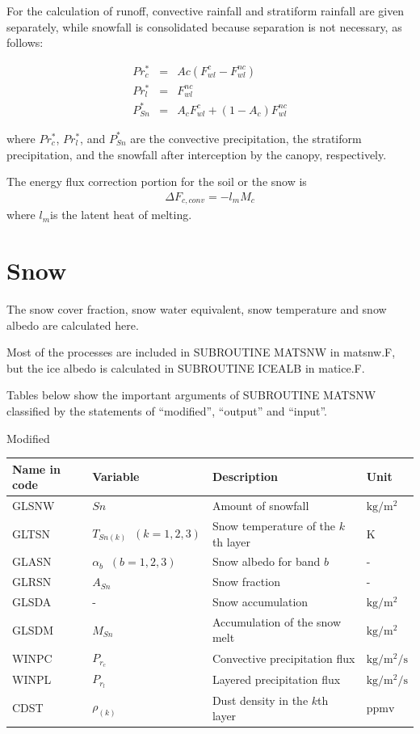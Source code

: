 For the calculation of runoff, convective rainfall and stratiform rainfall are given separately, while snowfall is consolidated because separation is not necessary, as follows:

\begin{eqnarray}
 Pr_c^\ast &=& Ac ( F_{wl}^{c} - F_{wl}^{nc} ) \\
 Pr_l^\ast &=& F_{wl}^{nc} \\
 P_{Sn}^\ast &=& A_c F_{wl}^{c} + (1-A_c) F_{wl}^{nc}
\end{eqnarray}

where \(Pr_c^*\), \(Pr_l^*\), and \(P_{Sn}^*\) are the convective precipitation, the stratiform precipitation, and the snowfall after interception by the canopy, respectively.

The energy flux correction portion for the soil or the snow is \begin{eqnarray}
 \Delta F_{c,conv} = - l_m M_c
\end{eqnarray} where \(l_m\)is the latent heat of melting.

\hypertarget{snow}{%
\section{Snow}\label{snow}}

The snow cover fraction, snow water equivalent, snow temperature and snow albedo are calculated here.

Most of the processes are included in SUBROUTINE MATSNW in matsnw.F, but the ice albedo is calculated in SUBROUTINE ICEALB in matice.F.

Tables below show the important arguments of SUBROUTINE MATSNW classified by the statements of ``modified'', ``output'' and ``input''.

Modified

\begin{longtable}[]{@{}llll@{}}
\toprule
Name in code & Variable & Description & Unit \\
\midrule
\endhead
GLSNW & \(Sn\) & Amount of snowfall & \(\mathrm{kg/m^2}\) \\
GLTSN & \(T_{Sn(k)} \;\; (k=1,2,3)\) & Snow temperature of the \(k\)th layer & \(\mathrm{K}\) \\
GLASN & \(\alpha_b \;\; (b=1,2,3)\) & Snow albedo for band \(b\) & - \\
GLRSN & \(A_{Sn}\) & Snow fraction & - \\
GLSDA & - & Snow accumulation & \(\mathrm{kg/m^2}\) \\
GLSDM & \(M_{Sn}\) & Accumulation of the snow melt & \(\mathrm{kg/m^2}\) \\
WINPC & \(P_{r_c}\) & Convective precipitation flux & \(\mathrm{kg/m^2/s}\) \\
WINPL & \(P_{r_l}\) & Layered precipitation flux & \(\mathrm{kg/m^2/s}\) \\
CDST & \(\rho_{(k)}\) & Dust density in the \(k\)th layer & \(\mathrm{ppmv}\) \\
\bottomrule
\end{longtable}

